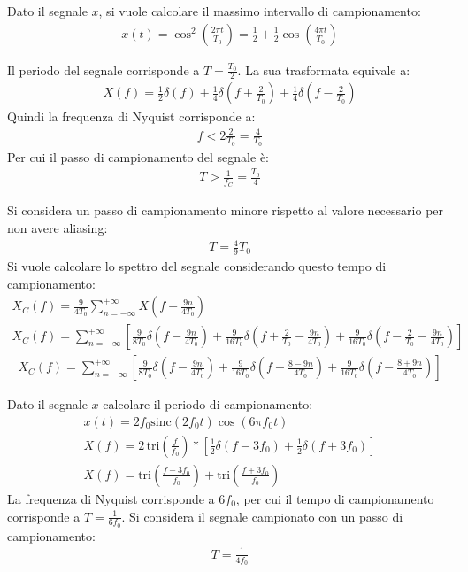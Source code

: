 \documentclass{article}
\begin{document}
Dato il segnale $x$, si vuole calcolare il massimo intervallo di campionamento:
\begin{gather*}
    x(t)=\cos^2\left(\displaystyle\frac{2\pi t}{T_0}\right)=\frac{1}{2}+\frac{1}{2}\cos\left(\frac{4\pi t}{T_0}\right)
\end{gather*}

Il periodo del segnale corrisponde a $T=\displaystyle\frac{T_0}{2}$. La sua trasformata equivale a:
\begin{gather*}
    X(f)=\displaystyle\frac{1}{2}\delta(f)+\frac{1}{4}\delta\left(f+\frac{2}{T_0}\right)+\frac{1}{4}\delta\left(f-\frac{2}{T_0}\right)
\end{gather*}
Quindi la frequenza di Nyquist corrisponde a:
\begin{gather*}
    f<2\frac{2}{T_0}=\frac{4}{T_0}
\end{gather*}
Per cui il passo di campionamento del segnale è:
\begin{gather}
    T>\displaystyle\frac{1}{f_C}=\frac{T_0}{4}
\end{gather}

Si considera un passo di campionamento minore rispetto al valore necessario per non avere aliasing: 
\begin{gather*}
    T=\frac{4}{9}T_0
\end{gather*}
Si vuole calcolare lo spettro del segnale considerando questo tempo di campionamento:
\begin{gather*}
    X_C(f)=\displaystyle\frac{9}{4T_0}\sum_{n=-\infty}^{+\infty}X\left(f-\frac{9n}{4T_0}\right)\\
    X_C(f)=\sum_{n=-\infty}^{+\infty}\left[\frac{9}{8T_0}\delta\left(f-\frac{9n}{4T_0}\right)+\frac{9}{16T_0}\delta\left(f+\frac{2}{T_0}-\frac{9n}{4T_0}\right)+\frac{9}{16T_0}\delta\left(f-\frac{2}{T_0}-\frac{9n}{4T_0}\right)\right]
\end{gather*}
\begin{gather}
    X_C(f)=\displaystyle\sum_{n=-\infty}^{+\infty}\left[\frac{9}{8T_0}\delta\left(f-\frac{9n}{4T_0}\right)+\frac{9}{16T_0}\delta\left(f+\frac{8-9n}{4T_0}\right)+\frac{9}{16T_0}\delta\left(f-\frac{8+9n}{4T_0}\right)\right]
\end{gather}

Dato il segnale $x$ calcolare il periodo di campionamento:
\begin{gather*}
    x(t)=2f_0\mbox{sinc}(2f_0t)\cos(6\pi f_0t)\\
    X(f)=\displaystyle2\,\mbox{tri}\left(\frac{f}{f_0}\right)*\left[\frac{1}{2}\delta\left(f-3f_0\right)+\frac{1}{2}\delta(f+3f_0)\right]\\
    X(f)=\displaystyle\mbox{tri}\left(\frac{f-3f_0}{f_0}\right)+\mbox{tri}\left(\frac{f+3f_0}{f_0}\right)
\end{gather*}
La frequenza di Nyquist corrisponde a $6f_0$, per cui il tempo di campionamento corrisponde a $T=\displaystyle\frac{1}{6f_0}$. Si considera il segnale campionato con un 
passo di campionamento:
\begin{gather*}
    T=\displaystyle\frac{1}{4f_0}
\end{gather*}
\end{document}
